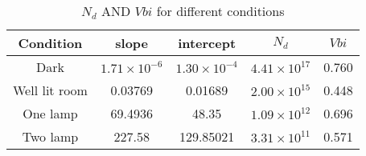 \begin{table}[H]
    \centering
    \begin{tabular}{|c|c|c|c|c|}
        \hline
        Condition     & slope               & intercept           & $N_d$               & $V{bi}$ \\ \hline
        Dark          & $1.71\times10^{-6}$ & $1.30\times10^{-4}$ & $4.41\times10^{17}$ & 0.760   \\
        Well lit room & 0.03769             & 0.01689             & $2.00\times10^{15}$ & 0.448   \\
        One lamp      & 69.4936             & 48.35               & $1.09\times10^{12}$ & 0.696   \\
        Two lamp      & 227.58              & 129.85021           & $3.31\times10^{11}$ & 0.571   \\ \hline
    \end{tabular}
    \caption{$N_d$ AND $V{bi}$  for different conditions}
\end{table}